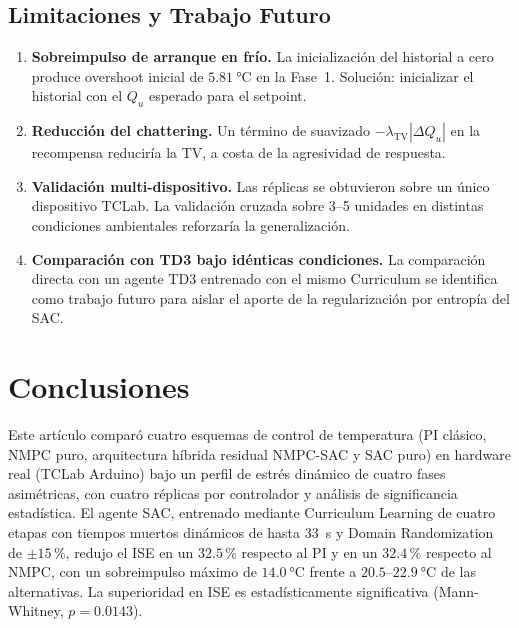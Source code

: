\documentclass[processes,article,submit,moreauthors,pdftex]{Definitions/mdpi}
\newcommand{\Qu}{Q_u}
\begin{document}
\subsection{Limitaciones y Trabajo Futuro}
\label{subsec:future}

\begin{enumerate}
  \item \textbf{Sobreimpulso de arranque en frío.} La inicialización del
  historial a cero produce overshoot inicial de $\SI{5.81}{\celsius}$ en la
  Fase~1. Solución: inicializar el historial con el $\Qu$ esperado para el
  setpoint.
  \item \textbf{Reducción del chattering.} Un término de suavizado
  $-\lambda_{\mathrm{TV}}|\Delta\Qu|$ en la recompensa reduciría la TV, a
  costa de la agresividad de respuesta.
  \item \textbf{Validación multi-dispositivo.} Las réplicas se obtuvieron
  sobre un único dispositivo TCLab. La validación cruzada sobre 3--5
  unidades en distintas condiciones ambientales reforzaría la
  generalización.
  \item \textbf{Comparación con TD3 bajo idénticas condiciones.} La
  comparación directa con un agente TD3 entrenado con el mismo Curriculum se
  identifica como trabajo futuro para aislar el aporte de la regularización
  por entropía del SAC.
\end{enumerate}


\section{Conclusiones}
\label{sec:conclusions}

Este artículo comparó cuatro esquemas de control de temperatura (PI
clásico, NMPC puro, arquitectura híbrida residual NMPC-SAC y SAC puro) en
hardware real (TCLab Arduino) bajo un perfil de estrés dinámico de cuatro
fases asimétricas, con cuatro réplicas por controlador y análisis de
significancia estadística. El agente SAC, entrenado mediante Curriculum
Learning de cuatro etapas con tiempos muertos dinámicos de hasta
\SI{33}{\second} y Domain Randomization de $\pm 15\,\%$, redujo el ISE en un
$32.5\,\%$ respecto al PI y en un $32.4\,\%$ respecto al NMPC, con un
sobreimpulso máximo de $\SI{14.0}{\celsius}$ frente a $20.5$--$\SI{22.9}{\celsius}$
de las alternativas. La superioridad en ISE es estadísticamente
significativa (Mann-Whitney, $p = 0.0143$).
\end{document}
